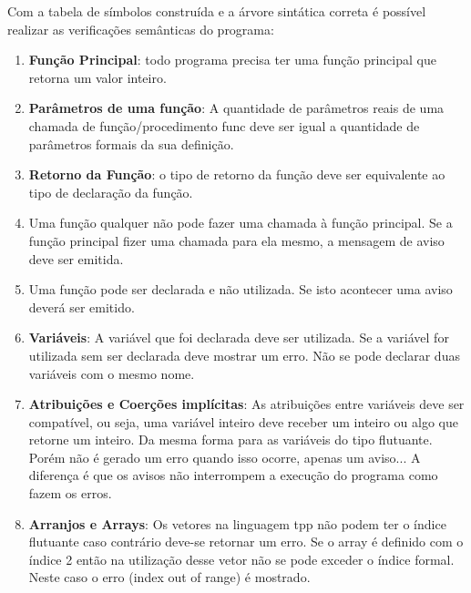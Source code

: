 \documentclass[12pt]{article}
\begin{document}
Com a tabela de símbolos construída e a árvore sintática correta é possível realizar as verificações semânticas do programa: 
\begin{enumerate}
\item \textbf{Função Principal}: todo programa precisa ter uma função principal que retorna um valor inteiro.  
	\item \textbf{Parâmetros de uma função}: A quantidade de parâmetros reais de uma chamada de
	função/procedimento func deve ser igual a quantidade de parâmetros formais da sua
	definição. 
	\item \textbf{Retorno da Função}: o tipo de retorno da função deve ser equivalente ao tipo de declaração da função.  
	\item Uma função qualquer não pode fazer uma chamada à função principal. Se a função principal fizer uma chamada para ela mesmo, a mensagem de aviso deve ser
	emitida. 
	\item Uma função pode ser declarada e não utilizada. Se isto acontecer uma aviso deverá ser
	emitido. 
	\item \textbf{Variáveis}: 
	A variável que foi declarada deve ser utilizada. Se a variável for utilizada sem ser declarada deve mostrar um erro. Não se pode declarar duas variáveis com o mesmo nome. 
	\item \textbf{Atribuições e Coerções implícitas}: As atribuições entre variáveis deve ser compatível, ou seja, uma variável inteiro deve receber um inteiro ou algo que retorne um inteiro. Da mesma forma para as variáveis do tipo flutuante. Porém não é gerado um erro quando isso ocorre, apenas um aviso... A diferença é que os avisos não interrompem a execução do programa como fazem os erros. 
	\item \textbf{Arranjos e Arrays}: Os vetores na linguagem tpp não podem ter o índice flutuante caso contrário deve-se retornar um erro. Se o array é definido com o índice 2 então na utilização desse vetor não se pode exceder o índice formal. Neste caso o erro (index out of range) é mostrado. 
	  
\end{enumerate} 
\end{document}
